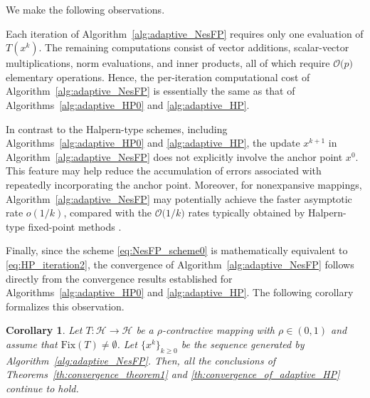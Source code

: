 \documentclass{article}
\theoremstyle{plain}
\newtheorem{corollary}{Corollary}[section]
\theoremstyle{definition}
\newcommand{\Hil}{\mathcal{H}}
\newcommand{\0}{\boldsymbol{0}}
\newcommand{\BigOs}[1]{\mathcal{O}\big(#1\big)}
\begin{document}
\noindent
We make the following observations.
\begin{compactitem}
\item Each iteration of Algorithm~\ref{alg:adaptive_NesFP} requires only one evaluation of $T(x^k)$. The remaining computations consist of vector additions, scalar-vector multiplications, norm evaluations, and inner products, all of which require $\BigOs{p}$ elementary operations. Hence, the per-iteration computational cost of Algorithm~\ref{alg:adaptive_NesFP} is essentially the same as that of Algorithms~\ref{alg:adaptive_HP0} and \ref{alg:adaptive_HP}.

	\item In contrast to the Halpern-type schemes, including Algorithms~\ref{alg:adaptive_HP0} and \ref{alg:adaptive_HP}, the update $x^{k+1}$ in Algorithm~\ref{alg:adaptive_NesFP} does not explicitly involve the anchor point $x^0$. This feature may help reduce the accumulation of errors associated with repeatedly incorporating the anchor point. Moreover, for nonexpansive mappings, Algorithm~\ref{alg:adaptive_NesFP} may potentially achieve the faster asymptotic rate $o(1/k)$, compared with the $\BigOs{1/k}$ rates typically obtained by Halpern-type fixed-point methods \cite{tran2022connection}.
\end{compactitem}
Finally, since the scheme \eqref{eq:NesFP_scheme0} is mathematically equivalent to \eqref{eq:HP_iteration2}, the convergence of Algorithm~\ref{alg:adaptive_NesFP} follows directly from the convergence results established for Algorithms~\ref{alg:adaptive_HP0} and \ref{alg:adaptive_HP}. The following corollary formalizes this observation.

\begin{corollary}\label{co:Nes_convergence}
Let $T : \Hil \to \Hil$ be a $\rho$-contractive mapping with $\rho \in (0,1)$ and assume that $\mathrm{Fix}(T)\neq\emptyset$. Let $\{x^k\}_{k\ge0}$ be the sequence generated by Algorithm~\ref{alg:adaptive_NesFP}. Then, all the conclusions of Theorems~\ref{th:convergence_theorem1} and \ref{th:convergence_of_adaptive_HP} continue to hold.
\end{corollary}

\end{document}
